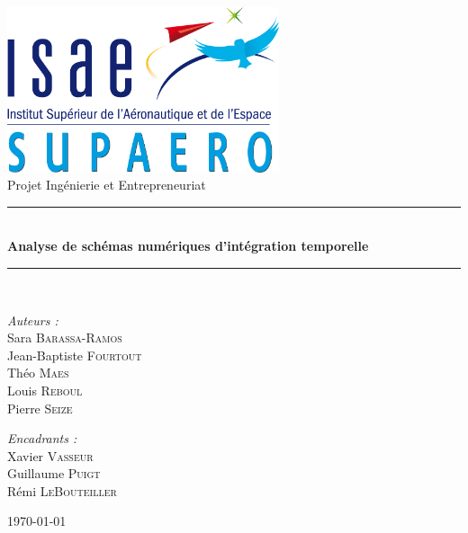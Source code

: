\begin{titlepage}\begin{center}

    \includegraphics[width=0.6\textwidth]{images/logo-isae-supaero.png}\\[1cm]

    {\large Projet Ingénierie et Entrepreneuriat}\\[0.5cm]

    \rule{\linewidth}{0.5mm}\\[0.4cm]
    {\huge \bfseries Analyse de schémas numériques d'intégration temporelle\\[0.4cm]}
    \rule{\linewidth}{0.5mm}\\[1.5cm]

    \noindent
    \begin{minipage}{0.4\textwidth}\begin{flushleft}\large
        \emph{Auteurs :}\\
        Sara \textsc{Barassa-Ramos}\\
        Jean-Baptiste \textsc{Fourtout}\\
        Théo \textsc{Maes} \\
        Louis \textsc{Reboul}\\
        Pierre \textsc{Seize}\\
    \end{flushleft}\end{minipage}%
    \begin{minipage}{0.4\textwidth}\begin{flushright}\large
        \emph{Encadrants :}\\
        Xavier \textsc{Vasseur}\\
        Guillaume \textsc{Puigt}\\
        Rémi \textsc{LeBouteiller}
    \end{flushright}\end{minipage}

    \vfill
    \today

\end{center}\end{titlepage}

